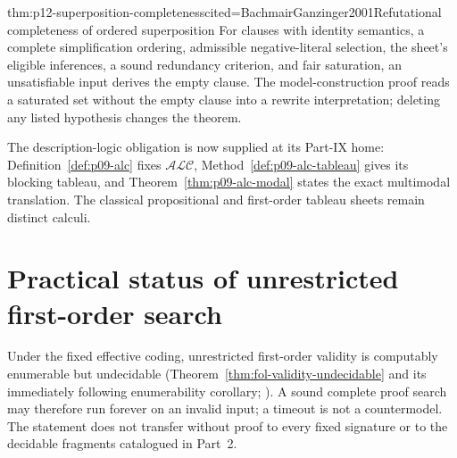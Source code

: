 \begin{hbtheorem}{thm:p12-superposition-completeness}{cited=BachmairGanzinger2001}{Refutational completeness of ordered superposition}
For clauses with identity semantics, a complete simplification ordering,
admissible negative-literal selection, the sheet's eligible inferences, a
sound redundancy criterion, and fair saturation, an unsatisfiable input
derives the empty clause. The model-construction proof reads a saturated set
without the empty clause into a rewrite interpretation; deleting any listed
hypothesis changes the theorem.
\end{hbtheorem}

The description-logic obligation is now supplied at its Part-IX home:
Definition~\ref{def:p09-alc} fixes \(\mathcal{ALC}\),
Method~\ref{def:p09-alc-tableau} gives its blocking tableau, and
Theorem~\ref{thm:p09-alc-modal} states the exact multimodal translation. The
classical propositional and first-order tableau sheets remain distinct
calculi.

\section{Practical status of unrestricted first-order search}

Under the fixed effective coding, unrestricted first-order validity is
computably enumerable but undecidable
(Theorem~\ref{thm:fol-validity-undecidable} and its immediately following
enumerability corollary;
\cite{Church1936,Turing1937}).  A sound complete proof search may therefore
run forever on an invalid input; a timeout is not a countermodel.  The statement
does not transfer without proof to every fixed signature or to the decidable
fragments catalogued in Part~2.
